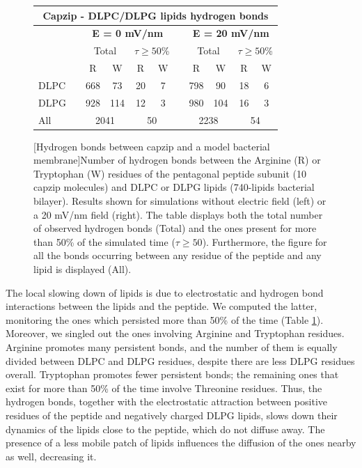 \begin{figure}[p!]
\centering
 \def\arraystretch{1.6}
\begin{tabular}{lcccccccccc}
\multicolumn{11}{c}{\textbf{Capzip - DLPC/DLPG lipids hydrogen bonds}} \\
\hline
&& \multicolumn{4}{c}{\textbf{E = 0 mV/nm}} && \multicolumn{4}{c}{\textbf{E = 20 mV/nm}} \\
\hline
 && \multicolumn{2}{c}{Total} & \multicolumn{2}{c}{$\displaystyle\tau \ge 50$\%}  && \multicolumn{2}{c}{Total} & \multicolumn{2}{c}{$\displaystyle\tau \ge 50$\%} \\
\hline
  && \multicolumn{1}{c}{R} & \multicolumn{1}{c}{W} & \multicolumn{1}{c}{R} & \multicolumn{1}{c}{W} && \multicolumn{1}{c}{R} & \multicolumn{1}{c}{W} & \multicolumn{1}{c}{R} & \multicolumn{1}{c}{W} \\
 {DLPC} && 668 & 73 & 20 & 7 && 798 & 90 & 18 & 6 \\
 {DLPG} && 928 & 114 & 12 & 3 && 980 & 104 & 16 & 3 \\
 \hline
 {All} && \multicolumn{2}{c}{2041} & \multicolumn{2}{c}{50} && \multicolumn{2}{c}{2238} & \multicolumn{2}{c}{54} \\
\hline
 \end{tabular}
[Hydrogen bonds between capzip and a model bacterial membrane]{Number of hydrogen bonds between the Arginine (R) or Tryptophan (W) residues of the pentagonal peptide subunit (10 capzip molecules) and DLPC or DLPG lipids (740-lipids bacterial bilayer). Results shown for simulations without electric field (left) or a 20 mV/nm field (right).
%
The table displays both the total number of observed hydrogen bonds (Total) and the ones present for more than 50\% of the simulated time ($\displaystyle\tau \ge 50$). Furthermore, the figure for all the bonds occurring between any residue of the peptide and any lipid is displayed (All).}
\label{table:hb_pr_lip}
\end{figure}

The local slowing down of lipids is due to electrostatic and hydrogen bond interactions between the lipids and the peptide. We computed the latter, monitoring the ones which persisted more than 50\% of the time (Table \ref{table:hb_pr_lip}). Moreover, we singled out the ones involving Arginine and Tryptophan residues.
%
Arginine promotes many persistent bonds, and the number of them is equally divided between DLPC and DLPG residues, despite there are less DLPG residues overall. Tryptophan promotes fewer persistent bonds; the remaining ones that exist for more than 50\% of the time involve Threonine residues.
%
Thus, the hydrogen bonds, together with the electrostatic attraction between positive residues of the peptide and negatively charged DLPG lipids, slows down their dynamics of the lipids close to the peptide, which do not diffuse away. The presence of a less mobile patch of lipids influences the diffusion of the ones nearby as well, decreasing it.

